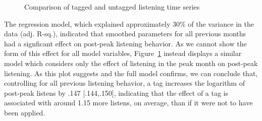   \begin{figure}
    \hfill
    \caption{Comparison of tagged and untagged listening time series}
    \label{fig:regression}
  \end{figure}

The regression model, which explained approximately 30\% of the variance in the data (adj. R-sq.), indicated that smoothed parameters for all previous months had a signficant effect on post-peak listening behavior.  As we cannot show the form of this effect for all model variables, Figure~\ref{fig:regression} instead displays a similar model which considers only the effect of listening in the peak month on post-peak listening. As this plot suggests and the full model confirms, we can conclude that, controlling for all previous listening behavior, a tag increases the logarithm of post-peak listens by .147 [.144,.150], indicating that the effect of a tag is associated with around 1.15 more listens, on average, than if it were not to have been applied.   

